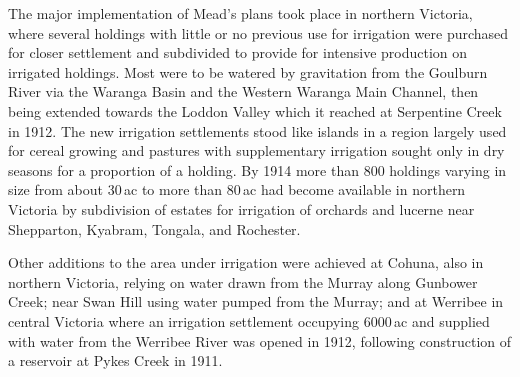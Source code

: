 The major implementation of Mead's plans took place in northern
Victoria, where several holdings with little or no previous use for
irrigation were purchased for closer settlement and subdivided to
provide for intensive production on irrigated holdings.  Most were to
be watered by gravitation from the Goulburn River via the Waranga
Basin and the Western Waranga Main Channel, then being extended
towards the Loddon Valley which it reached at Serpentine Creek in
1912.  The new irrigation settlements stood like islands in a region
largely used for cereal growing and pastures with supplementary
irrigation sought only in dry seasons for a proportion of a holding.
By 1914 more than 800 holdings varying in size from about 30\,ac to
more than 80\,ac had become available in northern Victoria by
subdivision of estates for irrigation of orchards and lucerne near
Shepparton, Kyabram, Tongala, and
Rochester.

Other additions to the area under irrigation were achieved at Cohuna,
also in northern Victoria, relying on water drawn from the Murray
along Gunbower Creek; near Swan Hill using water pumped from the
Murray; and at Werribee in central Victoria where an irrigation
settlement occupying 6000\,ac and supplied with water from the
Werribee River was opened in 1912, following construction of a
reservoir at Pykes Creek in 1911.

